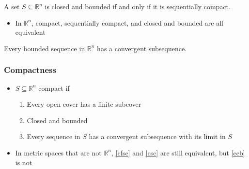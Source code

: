 \documentclass[compress]{beamer}
\def\R{\mathbb{R}}
\begin{document}
\begin{frame}
  \begin{theorem} \label{thm:bw}
    A set $S \subseteq \R^n$ is closed and bounded if and only if it is
    sequentially compact. 
  \end{theorem}
  \begin{itemize}
  \item In $\R^n$, compact, sequentially compact, and closed and
    bounded are all equivalent
  \end{itemize}
  \begin{corollary}
    Every bounded sequence in $\R^n$ has a convergent subsequence.
  \end{corollary}
\end{frame}

\begin{frame}
  \frametitle{Compactness}
  \begin{itemize}
  \item $S \subseteq \R^n$ compact if 
    \begin{enumerate}
    \item\label{cfsc} Every open cover has a finite subcover
    \item\label{ccb} Closed and bounded
    \item\label{csc} Every sequence in $S$ has a convergent subsequence with
      its limit in $S$
    \end{enumerate}
  \item In metric spaces that are not $\R^n$, \ref{cfsc} and \ref{csc}
    are still equivalent, but \ref{ccb} is not
  \end{itemize}
\end{frame}
\end{document}
